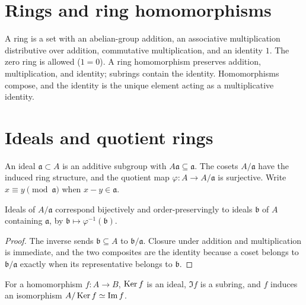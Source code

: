 \section{Rings and ring homomorphisms}
\label{am-ch1-rings}
\uses{}
\begin{definition}[Ring]
\label{am-def-ring}
\uses{}
A ring is a set with an abelian-group addition, an associative multiplication
distributive over addition, commutative multiplication, and an identity $1$.
The zero ring is allowed ($1=0$).  A ring homomorphism preserves addition,
multiplication, and identity; subrings contain the identity.  Homomorphisms
compose, and the identity is the unique element acting as a multiplicative
identity.
\end{definition}

\section{Ideals and quotient rings}
\label{am-ch1-ideals}
\begin{definition}
\label{am-def-ideal-quotient}
\uses{}
An ideal $\mathfrak{a}\subset A$ is an additive subgroup with $A\mathfrak{a}\subseteq\mathfrak{a}$.
The cosets $A/\mathfrak{a}$ have the induced ring structure, and the quotient map
$\varphi:A\to A/\mathfrak{a}$ is surjective.  Write $x\equiv y\pmod{\mathfrak{a}}$ when
$x-y\in\mathfrak{a}$.
\end{definition}
\begin{proposition}
\label{am-prop-1-1}
\uses{}
Ideals of $A/\mathfrak{a}$ correspond bijectively and order-preservingly to ideals
$\mathfrak{b}$ of $A$ containing $\mathfrak{a}$, by $\mathfrak{b}\mapsto\varphi^{-1}(\mathfrak{b})$.
\end{proposition}
\begin{proof}
The inverse sends $\mathfrak{b}\subseteq A$ to $\mathfrak{b}/\mathfrak{a}$.  Closure under
addition and multiplication is immediate, and the two composites are the
identity because a coset belongs to $\mathfrak{b}/\mathfrak{a}$ exactly when its
representative belongs to $\mathfrak{b}$.
\end{proof}
\begin{remark}
\label{am-rem-kernel-image}
\uses{}
For a homomorphism $f:A\to B$, $\operatorname{Ker} f$ is an ideal, $\Im f$ is a subring, and
$f$ induces an isomorphism $A/\operatorname{Ker} f\simeq\operatorname{Im} f$.
\end{remark}

